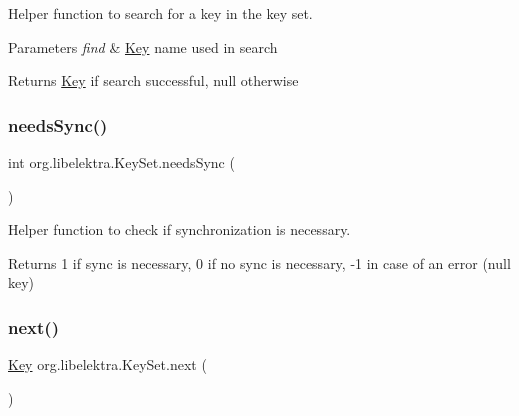 Helper function to search for a key in the key set. 


\begin{DoxyParams}{Parameters}
{\em find} & \hyperlink{classorg_1_1libelektra_1_1Key}{Key} name used in search \\
\hline
\end{DoxyParams}
\begin{DoxyReturn}{Returns}
\hyperlink{classorg_1_1libelektra_1_1Key}{Key} if search successful, null otherwise 
\end{DoxyReturn}
\mbox{\label{classorg_1_1libelektra_1_1KeySet_a9a21c729da19bc6fb2e7f33fe06ee15e}} 
\subsubsection{\texorpdfstring{needs\+Sync()}{needsSync()}}
{\footnotesize\ttfamily int org.\+libelektra.\+Key\+Set.\+needs\+Sync (\begin{DoxyParamCaption}{ }\end{DoxyParamCaption})\hspace{0.3cm}{\ttfamily [inline]}}



Helper function to check if synchronization is necessary. 

\begin{DoxyReturn}{Returns}
1 if sync is necessary, 0 if no sync is necessary, -\/1 in case of an error (null key) 
\end{DoxyReturn}
\mbox{\label{classorg_1_1libelektra_1_1KeySet_a92aa593320132e4272602dda29aee2c7}} 
\subsubsection{\texorpdfstring{next()}{next()}}
{\footnotesize\ttfamily \hyperlink{classorg_1_1libelektra_1_1Key}{Key} org.\+libelektra.\+Key\+Set.\+next (\begin{DoxyParamCaption}{ }\end{DoxyParamCaption})\hspace{0.3cm}{\ttfamily [inline]}}




